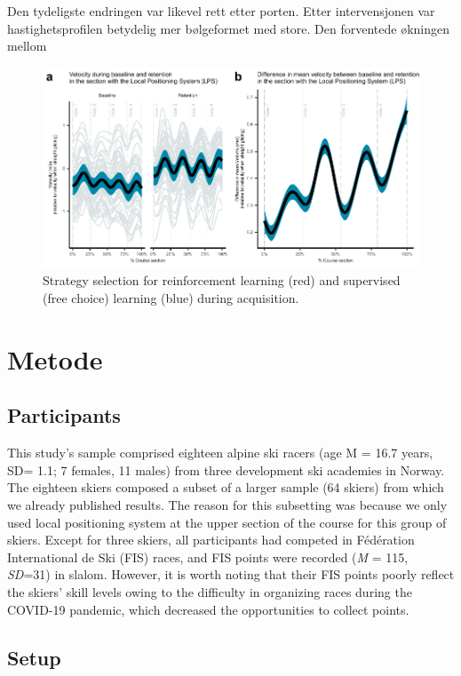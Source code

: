 \documentclass{article}
\begin{document}
Den tydeligste endringen var likevel rett etter porten. Etter intervensjonen var hastighetsprofilen betydelig mer bølgeformet med store. Den forventede økningen mellom


\begin{figure}[H]
\centering
\includegraphics{figurer/figure_velocity_2.pdf}
\caption{Strategy selection for reinforcement learning (red) and supervised (free choice) learning (blue) during acquisition.}\label{fig: velocity}
\end{figure}




\section{Metode}


\subsection*{Participants}
This study's sample comprised eighteen alpine ski racers (age M = 16.7 years, SD= 1.1; 7 females, 11 males) from three development ski academies in Norway. The eighteen skiers composed a subset of a larger sample (64 skiers) from which we already published results. The reason for this subsetting was because we only used local positioning system at the upper section of the course for this group of skiers. Except for three skiers, all participants had competed in Fédération International de Ski (FIS) races, and FIS points were recorded (\textit{M} = 115, \textit{SD}=31) in slalom. However, it is worth noting that their FIS points poorly reflect the skiers' skill levels owing to the difficulty in organizing races during the COVID-19 pandemic, which decreased the opportunities to collect points.  

\subsection{Setup}
\end{document}
